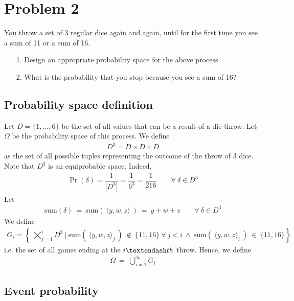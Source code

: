 
\section{Problem 2}

You throw a set of 3 regular dice again and again, until for the first time you see a
sum of 11 or a sum of 16.
\begin{itemize}
	\item[1.] Design an appropriate probability space for the above process.
	\item[2.] What is the probability that you stop because you see a sum of 16?
\end{itemize}

\subsection{Probability space definition}

Let $D = \{1, \ldots, 6\}$ be the set of all values that can be a result of a die throw. Let $\Omega$ be the probability space of this process. We define
\begin{align*}
	D^3 = D \times D \times D
\end{align*}
as the set of all possible tuples representing the outcome of the throw of 3 dice. Note that $D^3$ is an equiprobable space. Indeed,
\begin{align*}
	\Pr(\delta) = \dfrac{1}{|D^3|} = \dfrac{1}{6^3} = \dfrac{1}{216} \qquad \forall \ \delta\in D^3
\end{align*}
Let
\begin{align*}
	\mathrm{sum}(\delta) \ = \ \mathrm{sum}(\ \langle y,w,z \rangle \ ) \ = \ y + w + z \qquad \forall \ \delta\in D^3
\end{align*}
We define
\begin{align*}
	G_i = \left \{ \ \varprod_{j = 1}^{i} D^3 \ \big| \ \mathrm{sum}(\ \langle y,w,z \rangle_j \ ) \ \not\in \ \{11, 16\} \ \forall \ j < i \ \wedge \ \mathrm{sum}(\ \langle y,w,z \rangle_i \ ) \ \in \ \{11, 16\} \right \}
\end{align*}
i.e. the set of all games ending at the $i \textendash th$ throw. Hence, we define
\begin{align*}
	\Omega \ = \ \bigcup_{i = 1}^{\infty} G_i
\end{align*}


\subsection{Event probability}

